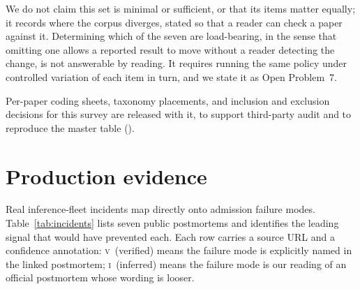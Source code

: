 We do not claim this set is minimal or sufficient, or that its items
matter equally; it records where the corpus diverges, stated so that a
reader can check a paper against it. Determining which of the seven are
load-bearing, in the sense that omitting one allows a reported result to
move without a reader detecting the change, is not answerable by
reading. It requires running the same policy under controlled variation
of each item in turn, and we state it as Open Problem~7.

Per-paper coding sheets, taxonomy placements, and inclusion and
exclusion decisions for this survey are released with it, to support
third-party audit and to reproduce the master table
(\artifacturl).

\section{Production evidence}
\label{sec:prod}

Real inference-fleet incidents map directly onto admission failure
modes. Table~\ref{tab:incidents} lists seven public postmortems and
identifies the leading signal that would have prevented each. Each
row carries a source URL and a confidence annotation:
\textsc{v}~(verified) means the failure mode is explicitly named in
the linked postmortem; \textsc{i}~(inferred) means the failure mode
is our reading of an official postmortem whose wording is looser.

